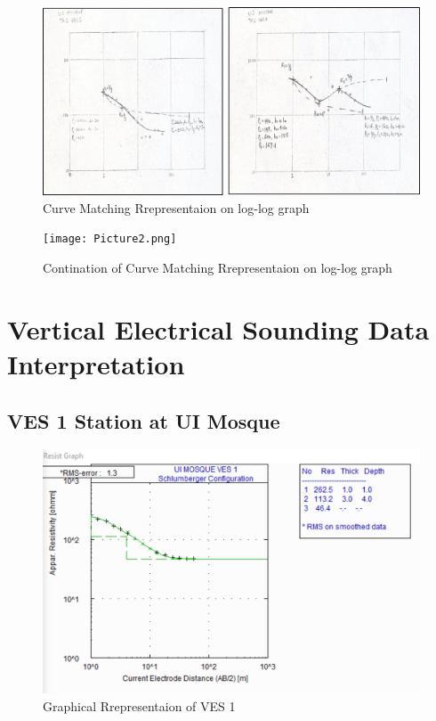 \documentclass[12pt,a4paper]{report}
\begin{document}
\begin{figure}[H]
    \centering
    \includegraphics[width=1.0\textwidth]{Picture3.png}
    \caption{Curve Matching Rrepresentaion on log-log graph}
    \label{fig:Curve Matching}
\end{figure}

\begin{figure}[H]
    \centering
    \texttt{[image: Picture2.png]}
    \caption{Contination of Curve Matching Rrepresentaion on log-log graph}
    \label{fig:Curve MAtching}
\end{figure}

\section{Vertical Electrical Sounding Data Interpretation}

\subsection{VES 1 Station at UI Mosque}

\begin{figure}[H]
    \centering
    \includegraphics[width=1.0\textwidth]{ui_ves1.png}
    \caption{Graphical Rrepresentaion of VES 1}
    \label{fig:VES_1_Curve}
\end{figure}
\end{document}
